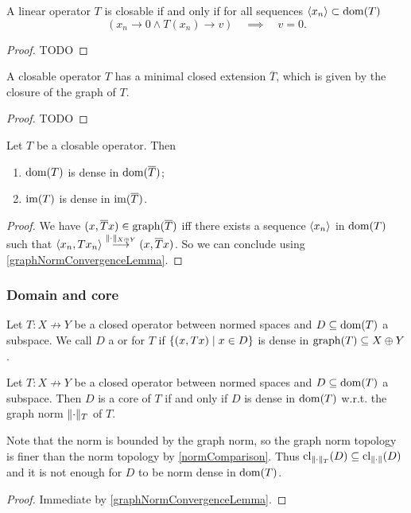 \begin{proposition} \label{closableCriterion}
A linear operator $T$ is closable \textup{if and only if} for all sequences $\left\langle x_n \right\rangle\subset\operatorname{dom}(T)$
\[ \left(x_n\to 0 \land T(x_n)\to v\right) \quad\implies\quad v = 0. \]
\end{proposition}
\begin{proof}
TODO
\end{proof}

\begin{lemma}
A closable operator $T$ has a minimal closed extension $\overline{T}$, which is given by the closure of the graph of $T$.
\end{lemma}
\begin{proof}
TODO
\end{proof}

\begin{lemma} \label{domImClosureOperator}
Let $T$ be a closable operator. Then
\begin{enumerate}
\item $\operatorname{dom}(T)$ is dense in $\operatorname{dom}(\overline{T})$;
\item $\operatorname{im}(T)$ is dense in $\operatorname{im}(\overline{T})$.
\end{enumerate}
\end{lemma}
\begin{proof}
We have $(x,\overline{T}x)\in\operatorname{graph}(\overline{T})$ iff there exists a sequence $\left\langle x_n \right\rangle$ in $\operatorname{dom}(T)$ such that $\left\langle x_n,Tx_n \right\rangle\overset{\lVert\cdot\rVert_{X\oplus Y}}{\longrightarrow} (x,\overline{T}x)$. So we can conclude using \ref{graphNormConvergenceLemma}.
\end{proof}

\subsubsection{Domain and core}
\begin{definition}
Let $T: X\not\to Y$ be a closed operator between normed spaces and $D\subseteq \operatorname{dom}(T)$ a subspace. We call $D$ a  or  for $T$ if $\setbuilder{(x,Tx)}{x\in D}$ is dense in $\operatorname{graph}(T)\subseteq X\oplus Y$.
\end{definition}

\begin{proposition} \label{operatorCoreCriterion}
Let $T: X\not\to Y$ be a closed operator between normed spaces and $D\subseteq \operatorname{dom}(T)$ a subspace. Then $D$ is a core of $T$ \textup{if and only if} $D$ is dense in $\operatorname{dom}(T)$ w.r.t. the graph norm $\lVert\cdot\rVert_T$ of $T$.
\end{proposition}
Note that the norm is bounded by the graph norm, so the graph norm topology is finer than the norm topology by \ref{normComparison}. Thus $\operatorname{cl}_{\lVert\cdot\rVert_T}(D) \subseteq \operatorname{cl}_{\lVert\cdot\rVert}(D)$ and it is not enough for $D$ to be norm dense in $\operatorname{dom}(T)$.
\begin{proof}
Immediate by \ref{graphNormConvergenceLemma}.
\end{proof}






